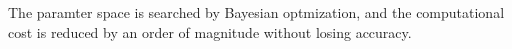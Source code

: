 The paramter space is searched by Bayesian optmization, and the computational cost is reduced by an order of magnitude without losing accuracy.

